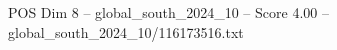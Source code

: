 \begin{textsample}{POS Dim 8 – global\_south\_2024\_10 – Score 4.00 – global\_south\_2024\_10/116173516.txt}
\end{textsample}
